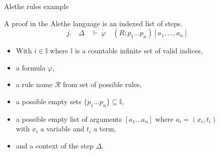 \documentclass[aspectratio=169,xcolor={dvipsnames}]{beamer}
\begin{document}
\begin{frame}{Alethe rules example}
\begin{definition}
A proof in the Alethe language is an indexed list of steps.
\begin{equation*}
    j. \quad  \Delta \quad \vdash~ \varphi \quad (R; p_1 \dots p_n)[a_1, \dots, a_n]\quad
\end{equation*}
\begin{itemize}
    \item[] With $i \in \mathbb{I}$  where $\mathbb{I}$ is a countable infinite set of valid indices, 
    \item[] a formula $\varphi$,
    \item[] a rule name $\mathcal{R}$ from set of possible rules,
    \item[] a possible empty sets $\{ p_1 \dots p_n \} \subseteq \mathbb{I}$,
    \item[] a possible empty list of arguments $[a_1 \dots a_n]$ where $a_i = (x_i, t_i)$\\
    with $x_i$ a variable and $t_i$ a term,
    \item[] and a context of the step $\Delta$.
\end{itemize}
\end{definition}
\end{frame}
\end{document}
